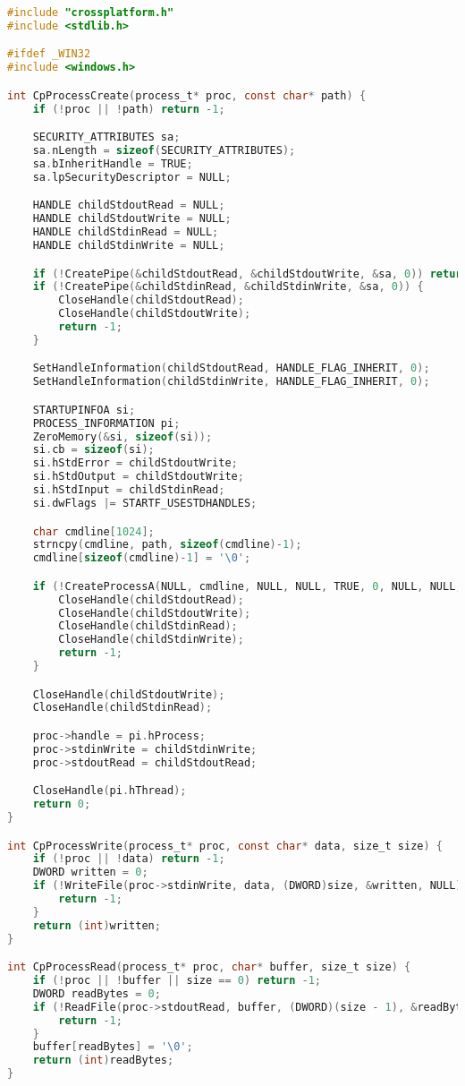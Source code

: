 \begin{lstlisting}[language=C]
#include "crossplatform.h"
#include <stdlib.h>

#ifdef _WIN32
#include <windows.h>

int CpProcessCreate(process_t* proc, const char* path) {
    if (!proc || !path) return -1;

    SECURITY_ATTRIBUTES sa;
    sa.nLength = sizeof(SECURITY_ATTRIBUTES);
    sa.bInheritHandle = TRUE;
    sa.lpSecurityDescriptor = NULL;

    HANDLE childStdoutRead = NULL;
    HANDLE childStdoutWrite = NULL;
    HANDLE childStdinRead = NULL;
    HANDLE childStdinWrite = NULL;

    if (!CreatePipe(&childStdoutRead, &childStdoutWrite, &sa, 0)) return -1;
    if (!CreatePipe(&childStdinRead, &childStdinWrite, &sa, 0)) {
        CloseHandle(childStdoutRead);
        CloseHandle(childStdoutWrite);
        return -1;
    }

    SetHandleInformation(childStdoutRead, HANDLE_FLAG_INHERIT, 0);
    SetHandleInformation(childStdinWrite, HANDLE_FLAG_INHERIT, 0);

    STARTUPINFOA si;
    PROCESS_INFORMATION pi;
    ZeroMemory(&si, sizeof(si));
    si.cb = sizeof(si);
    si.hStdError = childStdoutWrite;
    si.hStdOutput = childStdoutWrite;
    si.hStdInput = childStdinRead;
    si.dwFlags |= STARTF_USESTDHANDLES;

    char cmdline[1024];
    strncpy(cmdline, path, sizeof(cmdline)-1);
    cmdline[sizeof(cmdline)-1] = '\0';

    if (!CreateProcessA(NULL, cmdline, NULL, NULL, TRUE, 0, NULL, NULL, &si, &pi)) {
        CloseHandle(childStdoutRead);
        CloseHandle(childStdoutWrite);
        CloseHandle(childStdinRead);
        CloseHandle(childStdinWrite);
        return -1;
    }

    CloseHandle(childStdoutWrite);
    CloseHandle(childStdinRead);

    proc->handle = pi.hProcess;
    proc->stdinWrite = childStdinWrite;
    proc->stdoutRead = childStdoutRead;

    CloseHandle(pi.hThread);
    return 0;
}

int CpProcessWrite(process_t* proc, const char* data, size_t size) {
    if (!proc || !data) return -1;
    DWORD written = 0;
    if (!WriteFile(proc->stdinWrite, data, (DWORD)size, &written, NULL)) {
        return -1;
    }
    return (int)written;
}

int CpProcessRead(process_t* proc, char* buffer, size_t size) {
    if (!proc || !buffer || size == 0) return -1;
    DWORD readBytes = 0;
    if (!ReadFile(proc->stdoutRead, buffer, (DWORD)(size - 1), &readBytes, NULL)) {
        return -1;
    }
    buffer[readBytes] = '\0';
    return (int)readBytes;
}


\end{lstlisting}
